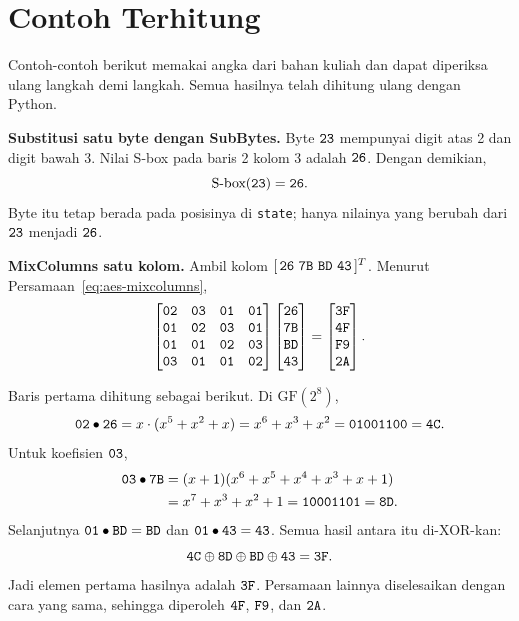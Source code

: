 \section{Contoh Terhitung}

Contoh-contoh berikut memakai angka dari bahan kuliah dan dapat diperiksa ulang
langkah demi langkah. Semua hasilnya telah dihitung ulang dengan Python.

\begin{example}
\textbf{Substitusi satu byte dengan SubBytes.} Byte $\texttt{23}$ mempunyai digit
atas 2 dan digit bawah 3. Nilai S-box pada baris 2 kolom 3 adalah $\texttt{26}$.
Dengan demikian,
\[
\text{S-box}(\texttt{23}) = \texttt{26}.
\]
Byte itu tetap berada pada posisinya di \texttt{state}; hanya nilainya yang
berubah dari $\texttt{23}$ menjadi $\texttt{26}$.
\end{example}

\begin{example}
\textbf{MixColumns satu kolom.} Ambil kolom
$[\,\code{26}\ \code{7B}\ \code{BD}\ \code{43}\,]^{T}$. Menurut
Persamaan~\eqref{eq:aes-mixcolumns},
\[
\begin{bmatrix}
\texttt{02} & \texttt{03} & \texttt{01} & \texttt{01} \\
\texttt{01} & \texttt{02} & \texttt{03} & \texttt{01} \\
\texttt{01} & \texttt{01} & \texttt{02} & \texttt{03} \\
\texttt{03} & \texttt{01} & \texttt{01} & \texttt{02}
\end{bmatrix}
\begin{bmatrix}
\texttt{26} \\ \texttt{7B} \\ \texttt{BD} \\ \texttt{43}
\end{bmatrix}
=
\begin{bmatrix}
\texttt{3F} \\ \texttt{4F} \\ \texttt{F9} \\ \texttt{2A}
\end{bmatrix}.
\]

Baris pertama dihitung sebagai berikut. Di $\text{GF}(2^8)$,
\[
\texttt{02} \bullet \texttt{26}
= x \cdot (x^5 + x^2 + x)
= x^6 + x^3 + x^2
= \texttt{01001100} = \texttt{4C}.
\]
Untuk koefisien $\texttt{03}$,
\[
\begin{aligned}
\texttt{03} \bullet \texttt{7B}
&= (x + 1)(x^6 + x^5 + x^4 + x^3 + x + 1) \\
&= x^7 + x^3 + x^2 + 1
= \texttt{10001101} = \texttt{8D}.
\end{aligned}
\]
Selanjutnya $\texttt{01} \bullet \texttt{BD} = \texttt{BD}$ dan
$\texttt{01} \bullet \texttt{43} = \texttt{43}$. Semua hasil antara itu di-XOR-kan:
\[
\texttt{4C} \oplus \texttt{8D} \oplus \texttt{BD} \oplus \texttt{43}
= \texttt{3F}.
\]
Jadi elemen pertama hasilnya adalah $\texttt{3F}$. Persamaan lainnya diselesaikan
dengan cara yang sama, sehingga diperoleh $\texttt{4F}$, $\texttt{F9}$, dan
$\texttt{2A}$.
\end{example}
